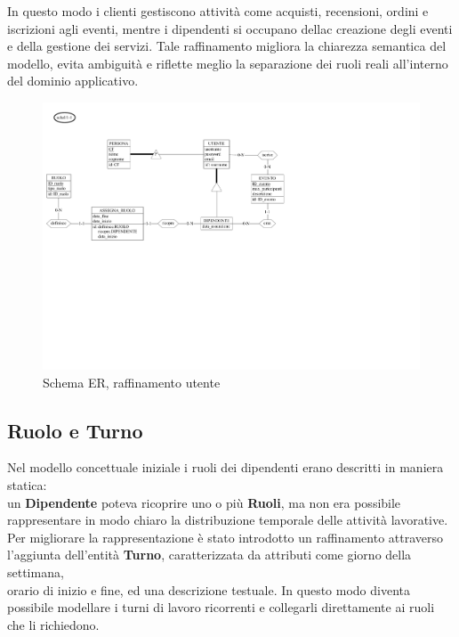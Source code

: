 \documentclass[a4paper,12pt]{report}
\begin{document}
\vspace{\baselineskip}
In questo modo i clienti gestiscono attività come acquisti, recensioni, ordini e iscrizioni agli eventi, mentre
i dipendenti si occupano dellac creazione degli eventi e della gestione dei servizi. Tale raffinamento migliora
la chiarezza semantica del modello, evita ambiguità e riflette meglio la separazione dei ruoli reali all'interno
del dominio applicativo.

\begin{figure}[H]
	\centering
	\includegraphics[width=\textwidth, trim=0 250pt 300pt 0, clip]{./pdf/raffinamento utente.pdf}
	\caption{Schema ER, raffinamento utente}
	\label{fig:raffinamento-utente}
\end{figure}

\newpage

\subsection{Ruolo e Turno}
Nel modello concettuale iniziale i ruoli dei dipendenti erano descritti in maniera statica:\\
un \textbf{Dipendente} poteva ricoprire uno o più \textbf{Ruoli}, ma non era possibile rappresentare
in modo chiaro la distribuzione temporale delle attività lavorative.\\

\vspace{\baselineskip}
Per migliorare la rappresentazione è stato introdotto un raffinamento attraverso
l’aggiunta dell’entità \textbf{Turno}, caratterizzata da attributi come giorno della settimana,\\
orario di inizio e fine, ed una descrizione testuale. In questo modo diventa possibile
modellare i turni di lavoro ricorrenti e collegarli direttamente ai ruoli che li richiedono.\\
\end{document}
